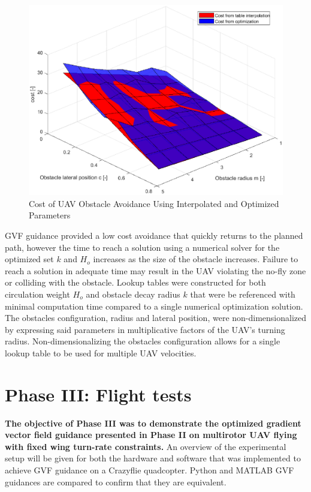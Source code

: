 \documentclass[numbered,pdftex]{ohio-etd}
\begin{document}
\begin{figure}[H]
	\centering
	\includegraphics[width=12cm]{PaperFigures/Methods/LookupTable/costPlanes}
	\caption{Cost of UAV Obstacle Avoidance Using Interpolated and Optimized Parameters}
	\label{fig:costplanes}
\end{figure}


GVF guidance provided a low cost avoidance that quickly returns to the planned path, however the time to reach a solution using a numerical solver for the optimized set $k$ and $H_o$ increases as the size of the obstacle increases. Failure to reach a solution in adequate time may result in the UAV violating the no-fly zone or colliding with the obstacle. Lookup tables were constructed for both circulation weight $H_o$ and obstacle decay radius $k$ that were be referenced with minimal computation time compared to a single numerical optimization solution. The obstacles configuration, radius and lateral position, were non-dimensionalized by expressing said parameters in multiplicative factors of the UAV's turning radius. Non-dimensionalizing the obstacles configuration allows for a single lookup table to be used for multiple UAV velocities. 




\section{Phase III: Flight tests}
\textbf{The objective of Phase III was to demonstrate the optimized gradient vector field guidance presented in Phase II on multirotor UAV flying with fixed wing turn-rate constraints.} An overview of the experimental setup will be given for both the hardware and software that was implemented to achieve GVF guidance on a Crazyflie quadcopter. Python and MATLAB GVF guidances are compared to confirm that they are equivalent.
\end{document}
